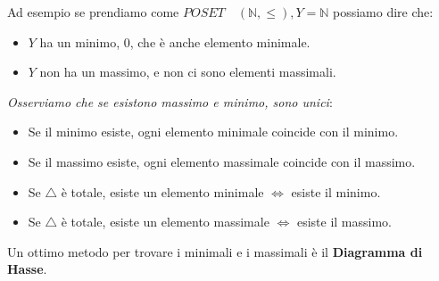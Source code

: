 \documentclass{article}
\begin{document}
Ad esempio se prendiamo come $POSET \quad (\mathbb{N}, \le), Y = \mathbb{N}$ possiamo dire che:
\begin{itemize}
        \item $Y$ ha un minimo, $0$, che è anche elemento minimale.
        \item $Y$ non ha un massimo, e non ci sono elementi massimali. 
\end{itemize}

\textit{Osserviamo che se esistono massimo e minimo, sono unici}:
\begin{itemize}
        \item Se il minimo esiste, ogni elemento minimale coincide con il minimo.
        \item Se il massimo esiste, ogni elemento massimale coincide con il massimo.
        \item Se $\triangle$ è totale, esiste un elemento minimale $\Leftrightarrow$ esiste il minimo.
        \item Se $\triangle$ è totale, esiste un elemento massimale $\Leftrightarrow$ esiste il massimo. 
\end{itemize}


Un ottimo metodo per trovare i minimali e i massimali è il \textbf{Diagramma di Hasse}. \par
\end{document}

